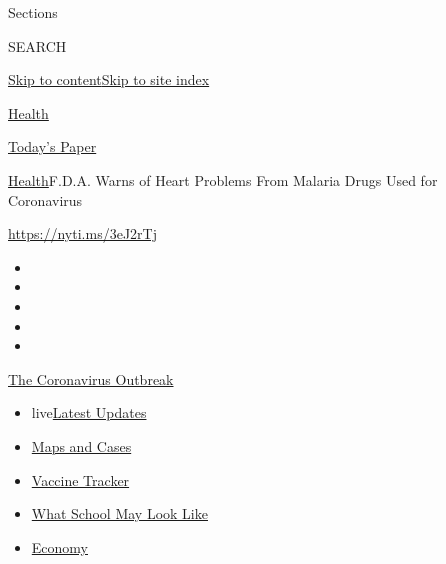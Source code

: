 Sections

SEARCH

\protect\hyperlink{site-content}{Skip to
content}\protect\hyperlink{site-index}{Skip to site index}

\href{https://www.nytimes3xbfgragh.onion/section/health}{Health}

\href{https://myaccount.nytimes3xbfgragh.onion/auth/login?response_type=cookie\&client_id=vi}{}

\href{https://www.nytimes3xbfgragh.onion/section/todayspaper}{Today's
Paper}

\href{/section/health}{Health}\textbar{}F.D.A. Warns of Heart Problems
From Malaria Drugs Used for Coronavirus

\url{https://nyti.ms/3eJ2rTj}

\begin{itemize}
\item
\item
\item
\item
\item
\end{itemize}

\href{https://www.nytimes3xbfgragh.onion/news-event/coronavirus?action=click\&pgtype=Article\&state=default\&region=TOP_BANNER\&context=storylines_menu}{The
Coronavirus Outbreak}

\begin{itemize}
\tightlist
\item
  live\href{https://www.nytimes3xbfgragh.onion/2020/08/01/world/coronavirus-covid-19.html?action=click\&pgtype=Article\&state=default\&region=TOP_BANNER\&context=storylines_menu}{Latest
  Updates}
\item
  \href{https://www.nytimes3xbfgragh.onion/interactive/2020/us/coronavirus-us-cases.html?action=click\&pgtype=Article\&state=default\&region=TOP_BANNER\&context=storylines_menu}{Maps
  and Cases}
\item
  \href{https://www.nytimes3xbfgragh.onion/interactive/2020/science/coronavirus-vaccine-tracker.html?action=click\&pgtype=Article\&state=default\&region=TOP_BANNER\&context=storylines_menu}{Vaccine
  Tracker}
\item
  \href{https://www.nytimes3xbfgragh.onion/interactive/2020/07/29/us/schools-reopening-coronavirus.html?action=click\&pgtype=Article\&state=default\&region=TOP_BANNER\&context=storylines_menu}{What
  School May Look Like}
\item
  \href{https://www.nytimes3xbfgragh.onion/live/2020/07/31/business/stock-market-today-coronavirus?action=click\&pgtype=Article\&state=default\&region=TOP_BANNER\&context=storylines_menu}{Economy}
\end{itemize}


